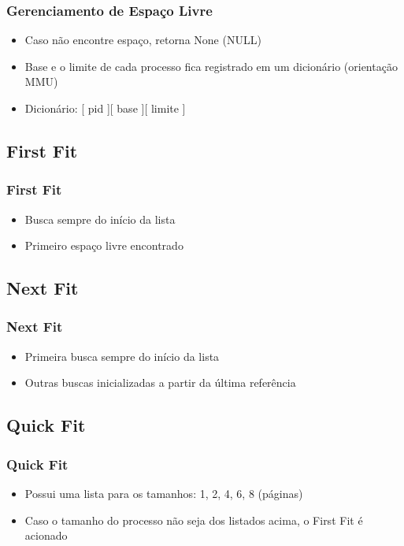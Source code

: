 \documentclass{beamer}
\begin{document}
\begin{frame}
\frametitle{Gerenciamento de Espaço Livre}
\begin{itemize}
\item Caso não encontre espaço, retorna None (NULL)

\item Base e o limite de cada processo fica registrado em um dicionário (orientação MMU) 

\item Dicionário: [ pid ][ base ][ limite ]
\end{itemize}
\end{frame}


\subsection{First Fit}
\begin{frame}
\frametitle{First Fit}
\begin{itemize}

\item Busca sempre do início da lista

\item Primeiro espaço livre encontrado
\end{itemize}

\justifying
\end{frame}

\subsection{Next Fit} 

\begin{frame}
\frametitle{Next Fit}
\begin{itemize}

\item Primeira busca sempre do início da lista

\item Outras buscas inicializadas a partir da última 
referência
\end{itemize}
\justifying
\end{frame}

\subsection{Quick Fit}
\begin{frame}
\frametitle{Quick Fit}
\begin{itemize}

\item Possui uma lista para os tamanhos: 1, 2, 4, 6, 8 (páginas)

\item Caso o tamanho do processo não seja dos listados acima, o First Fit é acionado

\end{itemize}
\justifying
\end{frame}
\end{document}
